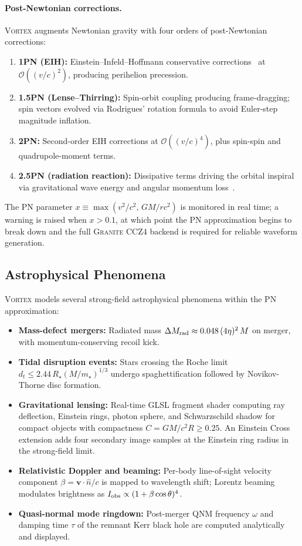 \documentclass[aps,prd,twocolumn,superscriptaddress,nofootinbib,showpacs,
               longbibliography]{revtex4-2}
\newcommand{\granite}{\textsc{Granite}}
\newcommand{\order}[1]{\mathcal{O}(#1)}
\begin{document}
\paragraph{Post-Newtonian corrections.}
\textsc{Vortex} augments Newtonian gravity with four orders of
post-Newtonian corrections:
\begin{enumerate}[nosep]
  \item \textbf{1PN (EIH):} Einstein--Infeld--Hoffmann conservative
    corrections~\cite{Will2014} at $\order{(v/c)^2}$, producing perihelion
    precession.
  \item \textbf{1.5PN (Lense--Thirring):} Spin-orbit coupling producing
    frame-dragging; spin vectors evolved via Rodrigues' rotation formula
    to avoid Euler-step magnitude inflation.
  \item \textbf{2PN:} Second-order EIH corrections at $\order{(v/c)^4}$,
    plus spin-spin and quadrupole-moment terms.
  \item \textbf{2.5PN (radiation reaction):} Dissipative terms driving
    the orbital inspiral via gravitational wave energy and angular
    momentum loss~\cite{Peters1964}.
\end{enumerate}
The PN parameter $x \equiv \max(v^2/c^2,\,GM/rc^2)$ is monitored in
real time; a warning is raised when $x > 0.1$, at which point the
PN approximation begins to break down and the full \granite{} CCZ4
backend is required for reliable waveform generation.

\subsection{Astrophysical Phenomena}
\label{sec:vortex_phenomena}

\textsc{Vortex} models several strong-field astrophysical phenomena
within the PN approximation:
\begin{itemize}[nosep]
  \item \textbf{Mass-defect mergers:}
    Radiated mass $\Delta M_{\rm rad} \approx 0.048\,(4\eta)^2\,M$ on
    merger, with momentum-conserving recoil kick.
  \item \textbf{Tidal disruption events:}
    Stars crossing the Roche limit
    $d_t \leq 2.44\,R_\star(M/m_\star)^{1/3}$ undergo spaghettification
    followed by Novikov-Thorne disc formation.
  \item \textbf{Gravitational lensing:}
    Real-time GLSL fragment shader computing ray deflection, Einstein
    rings, photon sphere, and Schwarzschild shadow for compact objects
    with compactness $C = GM/c^2R \geq 0.25$.
    An Einstein Cross extension adds four secondary image samples
    at the Einstein ring radius in the strong-field limit.
  \item \textbf{Relativistic Doppler and beaming:}
    Per-body line-of-sight velocity component
    $\beta = \mathbf{v}\cdot\hat{n}/c$ is mapped to wavelength shift;
    Lorentz beaming modulates brightness as
    $I_{\rm obs} \propto (1 + \beta\cos\theta)^4$.
  \item \textbf{Quasi-normal mode ringdown:}
    Post-merger QNM frequency $\omega$ and damping time $\tau$ of the
    remnant Kerr black hole are computed analytically and displayed.
\end{itemize}
\end{document}
